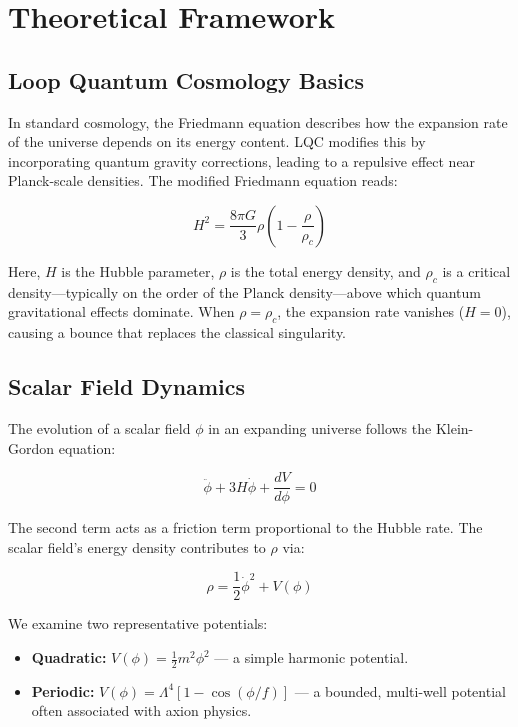 \documentclass[12pt]{article}
\begin{document}
\section{Theoretical Framework}

\subsection{Loop Quantum Cosmology Basics}

In standard cosmology, the Friedmann equation describes how the expansion rate of the universe depends on its energy content. LQC modifies this by incorporating quantum gravity corrections, leading to a repulsive effect near Planck-scale densities. The modified Friedmann equation reads:

\begin{equation}
H^2 = \frac{8\pi G}{3} \rho \left(1 - \frac{\rho}{\rho_c}\right)
\end{equation}

Here, $H$ is the Hubble parameter, $\rho$ is the total energy density, and $\rho_c$ is a critical density—typically on the order of the Planck density—above which quantum gravitational effects dominate. When $\rho = \rho_c$, the expansion rate vanishes ($H = 0$), causing a bounce that replaces the classical singularity.

\subsection{Scalar Field Dynamics}

The evolution of a scalar field $\phi$ in an expanding universe follows the Klein-Gordon equation:

\begin{equation}
\ddot{\phi} + 3H\dot{\phi} + \frac{dV}{d\phi} = 0
\end{equation}

The second term acts as a friction term proportional to the Hubble rate. The scalar field's energy density contributes to $\rho$ via:

\[
\rho = \frac{1}{2}\dot{\phi}^2 + V(\phi)
\]\cite{Mukhanov2005}

We examine two representative potentials:

\begin{itemize}
  \item \textbf{Quadratic:} $V(\phi) = \frac{1}{2}m^2\phi^2$ — a simple harmonic potential.
  \item \textbf{Periodic:} $V(\phi) = \Lambda^4[1 - \cos(\phi/f)]$ — a bounded, multi-well potential often associated with axion physics\cite{Marsh2016}.
\end{itemize}
\end{document}

